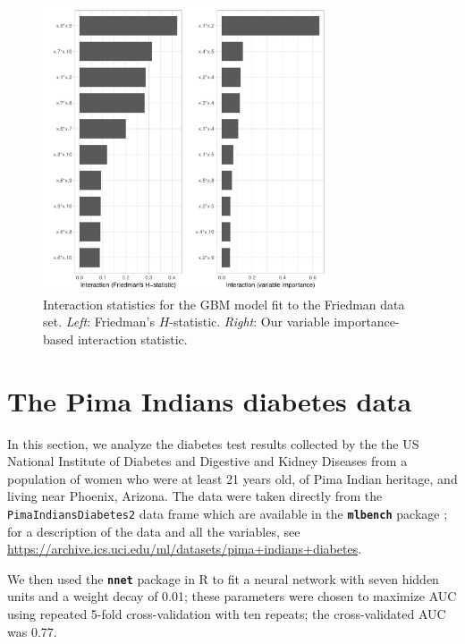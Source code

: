 \documentclass[12pt]{article}
\newcommand{\pkg}[1]{\texorpdfstring%
{{\normalfont\fontseries{b}\selectfont #1}}%
{#1}}
\def\code#1{\texttt{#1}}
\def\pkg#1{\textbf{\texttt{#1}}}
\begin{document}
\begin{figure}[!htb]
  \centering
  \includegraphics[width=0.75\textwidth]{gbm-int}
  \caption{Interaction statistics for the GBM model fit to the Friedman data set. \textit{Left}: Friedman's $H$-statistic. \textit{Right}: Our variable importance-based interaction statistic. \label{fig:gbm-int}}
\end{figure}


\section{The Pima Indians diabetes data}

In this section, we analyze the diabetes test results collected by the the US National Institute of Diabetes and Digestive and Kidney Diseases from a population of women who were at least 21 years old, of Pima Indian heritage, and living near Phoenix, Arizona. The data were taken directly from the \code{PimaIndiansDiabetes2} data frame which are available in the \pkg{mlbench} package \citep{mlbench-pkg}; for a description of the data and all the variables, see \url{https://archive.ics.uci.edu/ml/datasets/pima+indians+diabetes}.

We then used the \pkg{nnet} package \citep{venables-modern-2002} in R to fit a neural network with seven hidden units and a weight decay of 0.01; these parameters were chosen to maximize AUC using repeated 5-fold cross-validation with ten repeats; the cross-validated AUC was 0.77.
\end{document}
